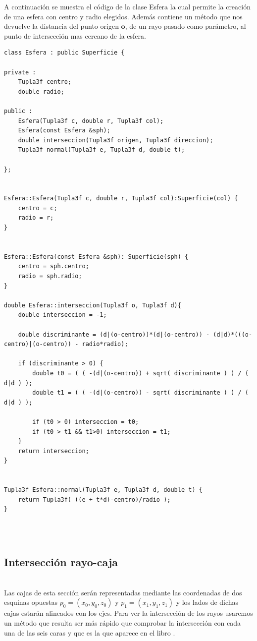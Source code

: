 A continuación se muestra el código de la clase Esfera la cual permite la creación de una esfera con centro y radio elegidos. Además contiene un método que nos devuelve la distancia del punto origen $\textbf{o}$, de un rayo pasado como parámetro, al punto de intersección mas cercano de la esfera.
${ }$\\

\begin{lstlisting}[style=Consola]
class Esfera : public Superficie {

private :
	Tupla3f centro;
	double radio;

public :
	Esfera(Tupla3f c, double r, Tupla3f col);
	Esfera(const Esfera &sph);
	double interseccion(Tupla3f origen, Tupla3f direccion);
	Tupla3f normal(Tupla3f e, Tupla3f d, double t);

};


Esfera::Esfera(Tupla3f c, double r, Tupla3f col):Superficie(col) {
	centro = c;
	radio = r;
}


Esfera::Esfera(const Esfera &sph): Superficie(sph) {
	centro = sph.centro;
	radio = sph.radio;
}

double Esfera::interseccion(Tupla3f o, Tupla3f d){
	double interseccion = -1;

	double discriminante = (d|(o-centro))*(d|(o-centro)) - (d|d)*(((o-centro)|(o-centro)) - radio*radio);

	if (discriminante > 0) {
		double t0 = ( ( -(d|(o-centro)) + sqrt( discriminante ) ) / ( d|d ) );
		double t1 = ( ( -(d|(o-centro)) - sqrt( discriminante ) ) / ( d|d ) );

		if (t0 > 0) interseccion = t0;
		if (t0 > t1 && t1>0) interseccion = t1;
	}
	return interseccion;
}


Tupla3f Esfera::normal(Tupla3f e, Tupla3f d, double t) {
	return Tupla3f( ((e + t*d)-centro)/radio );
}
\end{lstlisting}
${ }$\\

${ }$\\
\subsection{Intersección rayo-caja}
${ }$\\

Las cajas de esta sección serán representadas mediante las coordenadas de dos esquinas opuestas $p_0 = (x_0, y_0, z_0)$ y $p_1 = (x_1, y_1, z_1)$ y los lados de dichas cajas estarán alineados con los ejes. Para ver la intersección de los rayos usaremos un método que resulta ser más rápido que comprobar la intersección con cada una de las seis caras y que es la que aparece en el libro \cite{Shirley}.
	${ }$\\	
	
